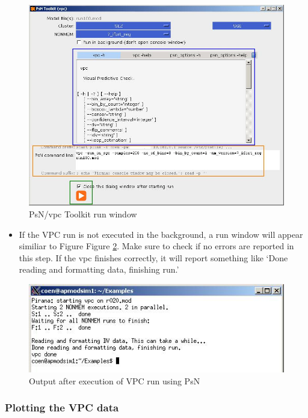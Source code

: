 \begin{figure}[h] \centering
    \includegraphics[scale=.4]{images/vpc_2.jpg}
    \caption{PsN/vpc Toolkit run window
     \label{fig:Fig2}}
\end{figure}

\begin{itemize}
\item If the VPC run is not executed in the background, a run window
  will appear similiar to Figure Figure \ref{fig:Fig3}. Make sure to check if no errors
  are reported in this step. If the vpc finishes correctly, it will
  report something like `Done reading and formatting data, finishing run.'
\end{itemize}

\begin{figure}[h] \centering
    \includegraphics[scale=.5]{images/vpc_3.jpg}
    \caption{Output after execution of VPC run using PsN
    \label{fig:Fig3}}
\end{figure}

\subsubsection*{Plotting the VPC data}

